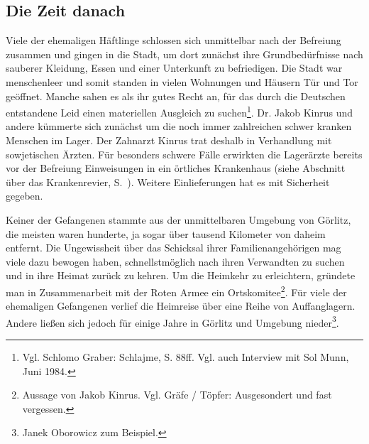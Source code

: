 

\subsection{Die Zeit danach}
Viele der ehemaligen Häftlinge schlossen sich unmittelbar nach der Befreiung zusammen und gingen in die Stadt, um dort zunächst ihre Grundbedürfnisse nach sauberer Kleidung, Essen und einer Unterkunft zu befriedigen. Die Stadt war menschenleer und somit standen in vielen Wohnungen und Häusern Tür und Tor geöffnet. Manche sahen es als ihr gutes Recht an, für das durch die Deutschen entstandene Leid einen materiellen Ausgleich zu suchen\footnote{Vgl. Schlomo Graber: Schlajme, S. 88ff. Vgl. auch Interview mit Sol Munn,  Juni 1984.}. Dr. Jakob Kinrus und andere kümmerte sich zunächst um die noch immer zahlreichen schwer kranken Menschen im Lager. Der Zahnarzt Kinrus trat deshalb in Verhandlung mit sowjetischen Ärzten. Für besonders schwere Fälle erwirkten die Lagerärzte bereits vor der Befreiung Einweisungen in ein örtliches Krankenhaus (siehe Abschnitt über das Krankenrevier, S.~\pageref{krankenhaus}). Weitere Einlieferungen hat es mit Sicherheit gegeben. 

Keiner der Gefangenen stammte aus der unmittelbaren Umgebung von Görlitz, die meisten waren hunderte, ja sogar über tausend Kilometer von daheim entfernt. Die Ungewissheit über das Schicksal ihrer Familienangehörigen mag viele dazu bewogen haben, schnellstmöglich nach ihren Verwandten zu suchen und in ihre Heimat zurück zu kehren. Um die Heimkehr zu erleichtern, gründete man in Zusammenarbeit mit der Roten Armee ein Ortskomitee\footnote{Aussage von Jakob Kinrus. Vgl. Gräfe / Töpfer: Ausgesondert und fast vergessen.}. Für viele der ehemaligen Gefangenen verlief die Heimreise über eine Reihe von Auffanglagern. Andere ließen sich jedoch für einige Jahre in Görlitz und Umgebung nieder\footnote{Janek Oborowicz zum Beispiel.}. 


